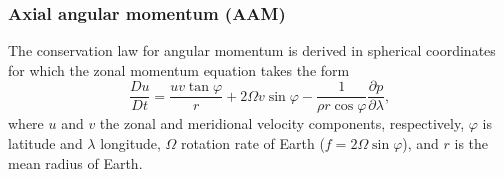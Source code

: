 \documentclass{agujournal}
\begin{document}
{\subsubsection{Axial angular momentum (AAM)}
The conservation law for angular momentum is derived in spherical coordinates for which the zonal momentum equation takes the form
\begin{equation}
\frac{Du}{Dt}=\frac{u v \tan \varphi}{r}+2\Omega v\sin \varphi -\frac{1}{\rho r \cos \varphi}\frac{\partial p}{\partial \lambda},\label{eq:tmp200}
\end{equation}
where $u$ and $v$ the zonal and meridional velocity components, respectively, $\varphi$ is latitude and $\lambda$ longitude, $\Omega$ rotation rate of Earth ($f=2\Omega \sin \varphi$), and $r$ is the mean radius of Earth.\\

}
\end{document}
